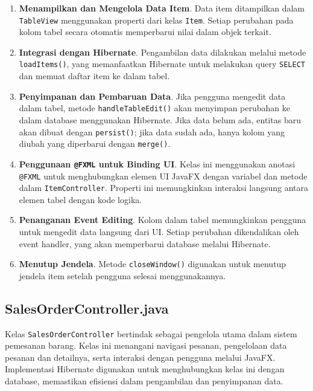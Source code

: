 \begin{enumerate}
	\item \textbf{Menampilkan dan Mengelola Data Item}.  
	Data item ditampilkan dalam \texttt{TableView} menggunakan properti dari kelas \texttt{Item}. Setiap perubahan pada kolom tabel secara otomatis memperbarui nilai dalam objek terkait.
	
	\item \textbf{Integrasi dengan Hibernate}.  
	Pengambilan data dilakukan melalui metode \texttt{loadItems()}, yang memanfaatkan Hibernate untuk melakukan query \texttt{SELECT} dan memuat daftar item ke dalam tabel.
	
	\item \textbf{Penyimpanan dan Pembaruan Data}.  
	Jika pengguna mengedit data dalam tabel, metode \texttt{handleTableEdit()} akan menyimpan perubahan ke dalam database menggunakan Hibernate. Jika data belum ada, entitas baru akan dibuat dengan \texttt{persist()}; jika data sudah ada, hanya kolom yang diubah yang diperbarui dengan \texttt{merge()}.
	
	\item \textbf{Penggunaan \texttt{@FXML} untuk Binding UI}.  
	Kelas ini menggunakan anotasi \texttt{@FXML} untuk menghubungkan elemen UI JavaFX dengan variabel dan metode dalam \texttt{ItemController}. Properti ini memungkinkan interaksi langsung antara elemen tabel dengan kode logika.
	
	\item \textbf{Penanganan Event Editing}.  
	Kolom dalam tabel memungkinkan pengguna untuk mengedit data langsung dari UI. Setiap perubahan dikendalikan oleh event handler, yang akan memperbarui database melalui Hibernate.
	
	\item \textbf{Menutup Jendela}.  
	Metode \texttt{closeWindow()} digunakan untuk menutup jendela item setelah pengguna selesai menggunakannya.
\end{enumerate}



\subsection{SalesOrderController.java}

Kelas \texttt{SalesOrderController} bertindak sebagai pengelola utama dalam sistem pemesanan barang. Kelas ini menangani navigasi pesanan, pengelolaan data pesanan dan detailnya, serta interaksi dengan pengguna melalui JavaFX. Implementasi Hibernate digunakan untuk menghubungkan kelas ini dengan database, memastikan efisiensi dalam pengambilan dan penyimpanan data.

